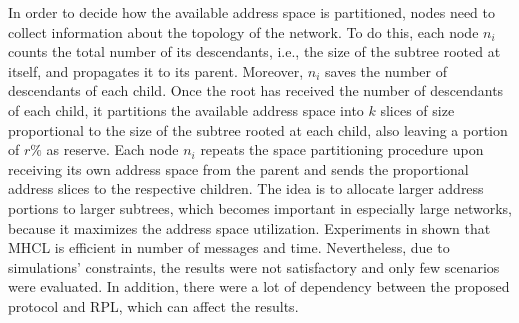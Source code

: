 In order to decide how the available address space is partitioned, nodes need to collect information about the topology of the network. To do this, each node $n_i$ counts the total number of its descendants, i.e., the size of the subtree rooted at itself, and propagates it to its parent. Moreover, $n_i$ saves the number of descendants of each child. Once the root has received the number of descendants of each child, it partitions the available address space into $k$ slices of size proportional to the size of the subtree rooted at each child, also leaving a portion of $r\%$ as reserve. Each node $n_i$ repeats the space partitioning procedure upon receiving its own address space from the parent and sends the proportional address slices to the respective children. The idea is to allocate larger address portions to larger subtrees, which becomes important in especially large networks, because it maximizes the address space utilization. Experiments in \cite{mhcl} shown that MHCL is efficient in number of messages and time. Nevertheless, due to simulations' constraints, the results were not satisfactory and only few scenarios were evaluated. In addition, there were a lot of dependency between the proposed protocol and RPL, which can affect the results.
